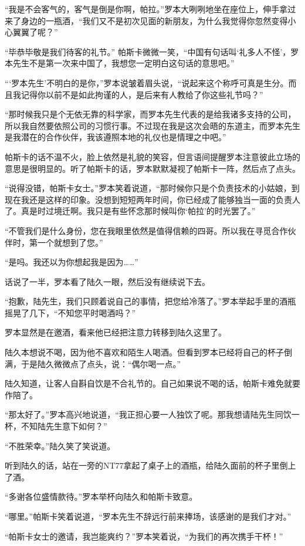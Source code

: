 “我是不会客气的，客气是倒是你啊，帕拉。”罗本大咧咧地坐在座位上，伸手拿过来了身边的一瓶酒，“我们又不是初次见面的新朋友，为什么我觉得你忽然变得小心翼翼了呢？”

“毕恭毕敬是我们待客的礼节。” 帕斯卡微微一笑，“中国有句话叫‘礼多人不怪’，罗本先生不是第一次来中国了，我想您一定明白这句话的意思吧。” 

“‘罗本先生’不明白的是你，”罗本说皱着眉头说，“说起来这个称呼可真是生分。而且我记得你以前不是如此拘谨的人，是后来有人教给了你这些礼节吗？”

“那时候我只是个无依无靠的科学家，而罗本先生代表的是给我诸多支持的公司，所以我自然要依照公司的习惯行事。不过现在我是这次会晤的东道主，而罗本先生是我潜在的合作伙伴，我该遵照本地的礼仪也是情理之中吧。”

帕斯卡的话不温不火，脸上依然是礼貌的笑容，但言语间提醒罗本注意彼此立场的意思是很明显的。听了帕斯卡的话，罗本默默凝视了帕斯卡一阵，然后点了点头。

“说得没错，帕斯卡女士。”罗本笑着说道，“那时候你只是个负责技术的小姑娘，到现在我还是这样的印象。没想到短短两年时间，你已经成了能够独当一面的负责人了。真是时过境迁啊。我只是有些怀念那时候叫你‘帕拉’的时光罢了。”

“不管我们是什么身份，您在我眼里依然是值得信赖的四哥。所以我在寻觅合作伙伴时，第一个就想到了您。”

“是吗。我还以为你想起我是因为……”

话说了一半，罗本看了陆久一眼，然后没有继续说下去。

“抱歉，陆先生，我们只顾着说自己的事情，把您给冷落了。”罗本举起手里的酒瓶摇晃了几下，“不知您平时喝酒吗？”

罗本显然是在邀酒，看来他已经把注意力转移到陆久这里了。

陆久本想说不喝，因为他不喜欢和陌生人喝酒。但看到罗本已经将自己的杯子倒满，于是陆久微微点了点头，说：“偶尔喝一点。”

陆久知道，让客人自斟自饮是不合礼节的。自己如果说不喝的话，帕斯卡难免就要作陪了。

“那太好了。”罗本高兴地说道，“我正担心要一人独饮了呢。那我想请陆先生同饮一杯，不知陆先生意下如何？”

“不胜荣幸。”陆久笑了笑说道。

听到陆久的话，站在一旁的NT77拿起了桌子上的酒瓶，给陆久面前的杯子里倒上了酒。

“多谢各位盛情款待。”罗本举杯向陆久和帕斯卡致意。

“哪里。”帕斯卡笑着说道，“罗本先生不辞远行前来捧场，该感谢的是我们才对。”

“帕斯卡女士的邀请，我岂能爽约？”罗本笑着说，“为我们的再次携手干杯！”

